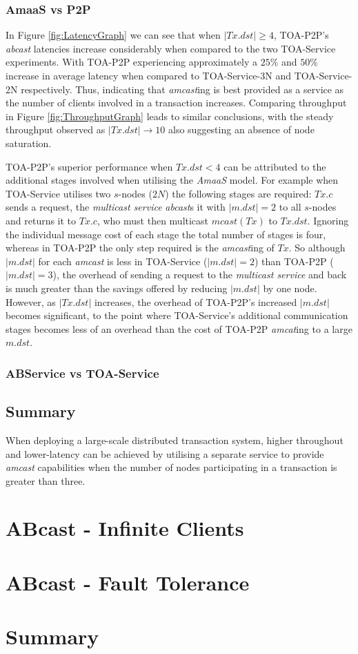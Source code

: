     \subsubsection*{AmaaS vs P2P}
	In Figure \ref{fig:LatencyGraph} we can see that when $|Tx.dst| \geq 4$, TOA-P2P's \emph{abcast} latencies increase considerably when compared to the two TOA-Service experiments.  With TOA-P2P experiencing approximately a $25\%$ and $50\%$ increase in average latency when compared to TOA-Service-3N and TOA-Service-2N respectively.  Thus, indicating that \emph{amcast}ing is best provided as a service as the number of clients involved in a transaction increases. Comparing throughput in Figure \ref{fig:ThroughputGraph} leads to similar conclusions, with the steady throughput observed as $|Tx.dst| \rightarrow 10$ also suggesting an absence of node saturation.  
	
	TOA-P2P's superior performance when $Tx.dst < 4$ can be attributed to the additional stages involved when utilising the \emph{AmaaS} model.  For example when TOA-Service utilises two $s$-nodes ($2N$) the following stages are required: $Tx.c$ sends a request, the \emph{multicast service} \emph{abcast}s it with $|m.dst| = 2$ to all $s$-nodes and returns it to $Tx.c$, who must then multicast $mcast(Tx)$ to $Tx.dst$.  Ignoring the individual message cost of each stage the total number of stages is four, whereas in TOA-P2P the only step required is the \emph{amcast}ing of $Tx$.  So although $|m.dst|$ for each \emph{amcast} is less in TOA-Service ($|m.dst| = 2$) than TOA-P2P ($|m.dst| = 3$), the overhead of sending a request to the \emph{multicast service} and back is much greater than the savings offered by reducing $|m.dst|$ by one node.  However, as $|Tx.dst|$ increases, the overhead of TOA-P2P's increased $|m.dst|$ becomes significant, to the point where TOA-Service's additional communication stages becomes less of an overhead than the cost of TOA-P2P \emph{amcat}ing to a large $m.dst$.  
	
    \subsubsection*{ABService vs TOA-Service}
    
	
	\subsection{Summary}
	When deploying a large-scale distributed transaction system, higher throughout and lower-latency can be achieved by utilising a separate service to provide \emph{amcast} capabilities when the number of nodes participating in a transaction is greater than three.  

\section{ABcast - Infinite Clients}

\section{ABcast - Fault Tolerance}

\section{Summary}